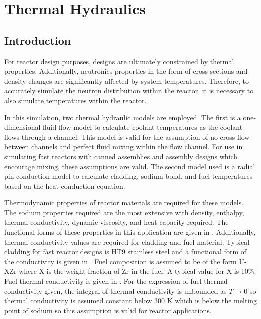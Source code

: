 \chapter{Thermal Hydraulics}
\label{ch:thermalHydraulics}

\section{Introduction}
  For reactor design purposes, designs are ultimately constrained by thermal
  properties. Additionally, neutronics properties in the form of cross sections
  and density changes are significantly affected by system temperatures.
  Therefore, to accurately simulate the neutron distribution within the reactor,
  it is necessary to also simulate temperatures within the reactor.

  In this simulation, two thermal hydraulic models are
  employed. The first is a one-dimensional fluid flow model to calculate coolant
  temperatures as the coolant flows through a channel. This model is valid for
  the assumption of no cross-flow between channels and perfect fluid mixing 
  within the flow channel. For use in simulating fast reactors with canned
  assemblies and assembly designs which encourage mixing, these assumptions are
  valid. The second model used is a radial
  pin-conduction model to calculate cladding, sodium bond, and fuel temperatures
  based on the heat conduction equation.

  Thermodynamic properties of reactor materials are required for these models.
  The sodium properties required are the most extensive with density, enthalpy, 
  thermal conductivity, dynamic viscosity, and heat capacity required. The 
  functional forms of these properties in this application are given in 
  \cite{sodiumProp}. Additionally, thermal conductivity values are required for 
  cladding and fuel material. Typical cladding for fast reactor designs is HT9
  stainless steel and a functional form of the conductivity is given in
  \cite{ht9Prop}. Fuel composition is assumed to be of the form U-XZr where
  X is the weight fraction of Zr in the fuel. A typical value for X is 10\%.
  Fuel thermal conductivity is given in \cite{fuelProp}. For the expression of
  fuel thermal conductivity given, the integral of thermal conductivity 
  is unbounded as $T \rightarrow 0$ so thermal conductivity is assumed
  constant below 300 K which is below the melting point of sodium so this
  assumption is valid for reactor applications.

